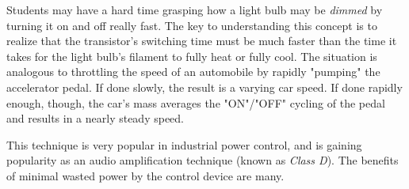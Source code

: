 





Students may have a hard time grasping how a light bulb may be {\it dimmed} by turning it on and off really fast.  The key to understanding this concept is to realize that the transistor's switching time must be much faster than the time it takes for the light bulb's filament to fully heat or fully cool.  The situation is analogous to throttling the speed of an automobile by rapidly "pumping" the accelerator pedal.  If done slowly, the result is a varying car speed.  If done rapidly enough, though, the car's mass averages the "ON"/"OFF" cycling of the pedal and results in a nearly steady speed.

This technique is very popular in industrial power control, and is gaining popularity as an audio amplification technique (known as {\it Class D}).  The benefits of minimal wasted power by the control device are many.




